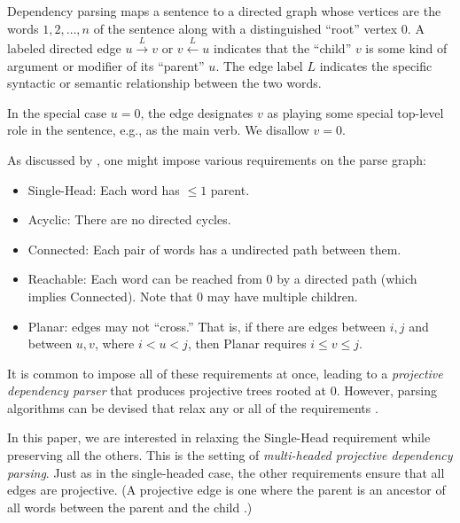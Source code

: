 \documentclass[a4paper,11pt]{article}
\newcommand{\newcite}[1]{\cite{#1}}   %
\begin{document}
Dependency parsing maps a sentence to a directed graph whose vertices are the words $1, 2, \ldots, n$ of the sentence along with a distinguished ``root'' vertex 0.  A labeled directed edge $u \stackrel{L}{\rightarrow} v$ or $v \stackrel{L}{\leftarrow} u$ indicates that the ``child'' $v$ is some kind of argument or modifier of its ``parent'' $u$.  The edge label $L$ indicates the specific syntactic or semantic relationship between the two words.  

In the special case $u=0$, the edge designates $v$ as playing some special top-level role in the sentence, e.g., as the main verb.  We disallow $v=0$.

As discussed by \newcite{kuhlmann-nivre-2006,gomezrodriguez-nivre-2013}, one might impose various requirements on the parse graph:
\begin{itemize}[noitemsep]
\item {\sc Single-Head}: Each word has $\leq 1$ parent.
\item {\sc Acyclic}: There are no directed cycles.
\item {\sc Connected}: Each pair of words has a undirected path between them.
\item {\sc Reachable}: Each word can be reached from 0 by a directed path (which implies {\sc Connected}).  Note that 0 may have multiple children.
\item {\sc Planar}: edges may not ``cross.''  That is, if there are edges between $i,j$ and between $u,v$, where $i < u < j$, then {\sc Planar} requires $i \leq v \leq j$.
\end{itemize}
It is common to impose all of these requirements at once, leading to a {\em projective dependency parser} that produces projective trees rooted at 0.  However, parsing algorithms can be devised that relax any or all of the requirements \cite{gomezrodriguez-nivre-2013}.  

In this paper, we are interested in relaxing the {\sc Single-Head} requirement while preserving all the others.  This is the setting of {\em multi-headed projective dependency parsing}.  Just as in the single-headed case, the other requirements ensure that all edges are projective.  (A projective edge is one where the parent is an ancestor of all words between the parent and the child \cite{nivre-slides}.)
\end{document}
